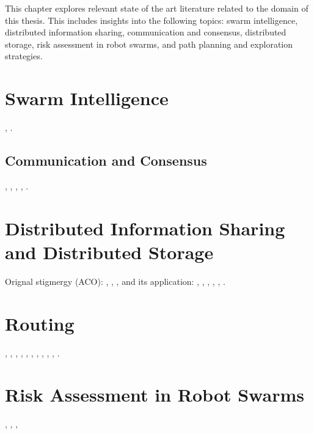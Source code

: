 \label{sec:RevLitt}
This chapter explores relevant state of the art literature related to the domain of this thesis. This includes insights into the following topics: swarm intelligence, distributed information sharing, communication and consensus, distributed storage, risk assessment in robot swarms, and path planning and exploration strategies.

\section{Swarm Intelligence}
\cite{dorigo2021swarm}, \cite{prorok2021beyond}.

\subsection{Communication and Consensus}
\cite{reina2015design}, \cite{valentini2017achieving}, \cite{selden2021botnet}, \cite{dutta2020efficient}, \cite{davis2016consensus}.

\section{Distributed Information Sharing and Distributed Storage}
Orignal stigmergy (ACO): \cite{dorigo2006ant},
\cite{amigoni2017multirobot}, \cite{pinciroliTuple2016}, \cite{majcherczykSwarmmesh2020} and its application: \cite{majcherczyk2021distributed}, \cite{varadharajan2020soul}, \cite{wu2008ldht}, \cite{ratnasamy2002ght}, \cite{araujo2005chr}, \cite{ahullo2008supporting}.

\section{Routing}
\cite{draves2004comparison}, \cite{watteyne2009implementation}, \cite{kuruvila2005hop}, \cite{zhang2014efficient}, \cite{al2019efficient}, \cite{jiang2018effective}, \cite{liao2008data}, \cite{dhand2016data}, \cite{tolstaya2021learning}, \cite{ganesan2002empirical}, \cite{hui2004dynamic}.

\section{Risk Assessment in Robot Swarms}
\cite{stachnissMappingExplorationMobile2003}, \cite{kobayashiSharingExploringInformation2002}, \cite{kobayashiDeterminationExplorationTarget2003}, \cite{indelmanCooperativeMultirobotBelief2018}

